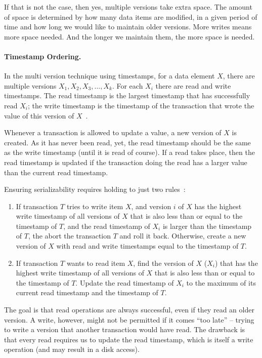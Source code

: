 \documentclass[a4paper]{report}
\begin{document}
If that is not the case, then yes, multiple versions take extra space. The amount of space is determined by how many data items are modified, in a given period of time and how long we would like to maintain older versions. More writes means more space needed. And the longer we maintain them, the more space is needed. 

\paragraph{Timestamp Ordering.} In the multi version technique using timestamps, for a data element $X$, there are multiple versions $X_{1}, X_{2}, X_{3}, ... , X_{k}$. For each $X_{i}$ there are read and write timestamps. The read timestamp is the largest timestamp that has successfully read $X_{i}$; the write timestamp is the timestamp of the transaction that wrote the value of this version of $X$~\cite{fds}. 

Whenever a transaction is allowed to update a value, a new version of $X$ is created. As it has never been read, yet, the read timestamp should be the same as the write timestamp (until it is read of course). If a read takes place, then the read timestamp is updated if the transaction doing the read has a larger value than the current read timestamp.

Ensuring serializability requires holding to just two rules~\cite{fds}:

\begin{enumerate}
	\item If transaction $T$ tries to write item $X$, and version $i$ of $X$ has the highest write timestamp of all versions of $X$ that is also less than or equal to the timestamp of $T$, and the read timestamp of $X_{i}$ is larger than the timestamp of $T$, the abort the transaction $T$ and roll it back. Otherwise, create a new version of $X$ with read and write timestamps equal to the timestamp of $T$.
	
	\item If transaction $T$ wants to read item $X$, find the version of $X$ ($X_{i}$) that has the highest write timestamp of all versions of $X$ that is also less than or equal to the timestamp of $T$. Update the read timestamp of $X_{i}$ to the maximum of its current read timestamp and the timestamp of $T$.
\end{enumerate}

The goal is that read operations are always successful, even if they read an older version. A write, however, might not be permitted if it comes ``too late'' -- trying to write a version that another transaction would have read. The drawback is that every read requires us to update the read timestamp, which is itself a write operation (and may result in a disk access).
\end{document}
